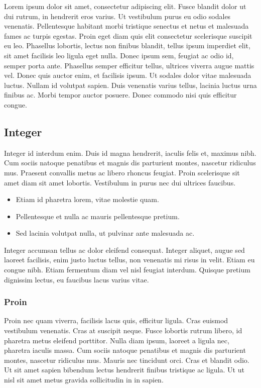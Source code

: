 Lorem ipsum dolor sit amet, consectetur adipiscing elit. Fusce blandit dolor ut dui rutrum, in hendrerit eros varius. Ut vestibulum purus eu odio sodales venenatis. Pellentesque habitant morbi tristique senectus et netus et malesuada fames ac turpis egestas. Proin eget diam quis elit consectetur scelerisque suscipit eu leo. Phasellus lobortis, lectus non finibus blandit, tellus ipsum imperdiet elit, sit amet facilisis leo ligula eget nulla. Donec ipsum sem, feugiat ac odio id, semper porta ante. Phasellus semper efficitur tellus, ultrices viverra augue mattis vel. Donec quis auctor enim, et facilisis ipsum. Ut sodales dolor vitae malesuada luctus. Nullam id volutpat sapien. Duis venenatis varius tellus, lacinia luctus urna finibus ac. Morbi tempor auctor posuere. Donec commodo nisi quis efficitur congue. \\

\subsection{Integer}
Integer id interdum enim. Duis id magna hendrerit, iaculis felis et, maximus nibh. Cum sociis natoque penatibus et magnis dis parturient montes, nascetur ridiculus mus. Praesent convallis metus ac libero rhoncus feugiat. Proin scelerisque sit amet diam sit amet lobortis. Vestibulum in purus nec dui ultrices faucibus.
\begin{itemize}
	\item Etiam id pharetra lorem, vitae molestie quam.
	\item Pellentesque et nulla ac mauris pellentesque pretium.
	\item Sed lacinia volutpat nulla, ut pulvinar ante malesuada ac.
\end{itemize}
Integer accumsan tellus ac dolor eleifend consequat. Integer aliquet, augue sed laoreet facilisis, enim justo luctus tellus, non venenatis mi risus in velit. Etiam eu congue nibh. Etiam fermentum diam vel nisl feugiat interdum. Quisque pretium dignissim lectus, eu faucibus lacus varius vitae. \\

\subsubsection{Proin}
Proin nec quam viverra, facilisis lacus quis, efficitur ligula. Cras euismod vestibulum venenatis. Cras at suscipit neque. Fusce lobortis rutrum libero, id pharetra metus eleifend porttitor. Nulla diam ipsum, laoreet a ligula nec, pharetra iaculis massa. Cum sociis natoque penatibus et magnis dis parturient montes, nascetur ridiculus mus. Mauris nec tincidunt orci. Cras et blandit odio. Ut sit amet sapien bibendum lectus hendrerit finibus tristique ac ligula. Ut ut nisl sit amet metus gravida sollicitudin in in sapien. \\

